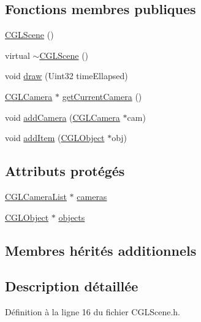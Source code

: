 \subsection*{Fonctions membres publiques}
\begin{DoxyCompactItemize}
\item 
\hyperlink{class_c_g_l_scene_aa221e551bb267aca47c05cbb3121ccb6}{C\-G\-L\-Scene} ()
\item 
virtual \hyperlink{class_c_g_l_scene_a5436d6d4aab37ec1940ce16df0fe97b8}{$\sim$\-C\-G\-L\-Scene} ()
\item 
void \hyperlink{class_c_g_l_scene_ad6c70504f83937f819d08e76d25f05d0}{draw} (Uint32 time\-Ellapsed)
\item 
\hyperlink{class_c_g_l_camera}{C\-G\-L\-Camera} $\ast$ \hyperlink{class_c_g_l_scene_afa2e2794f2f8c6b80b293703e411f7fe}{get\-Current\-Camera} ()
\item 
void \hyperlink{class_c_g_l_scene_acb982aaf33d81d1169a0a7844ac2ee6a}{add\-Camera} (\hyperlink{class_c_g_l_camera}{C\-G\-L\-Camera} $\ast$cam)
\item 
void \hyperlink{class_c_g_l_scene_aca6d85a7e345751c7fa58ca68bde3ea2}{add\-Item} (\hyperlink{class_c_g_l_object}{C\-G\-L\-Object} $\ast$obj)
\end{DoxyCompactItemize}
\subsection*{Attributs protégés}
\begin{DoxyCompactItemize}
\item 
\hyperlink{class_c_g_l_camera_list}{C\-G\-L\-Camera\-List} $\ast$ \hyperlink{class_c_g_l_scene_aa57c4220c940450c378279aaf35ef336}{cameras}
\item 
\hyperlink{class_c_g_l_object}{C\-G\-L\-Object} $\ast$ \hyperlink{class_c_g_l_scene_a4663f82695310eb9bee34ecc1c74c886}{objects}
\end{DoxyCompactItemize}
\subsection*{Membres hérités additionnels}


\subsection{Description détaillée}


Définition à la ligne 16 du fichier C\-G\-L\-Scene.\-h.



